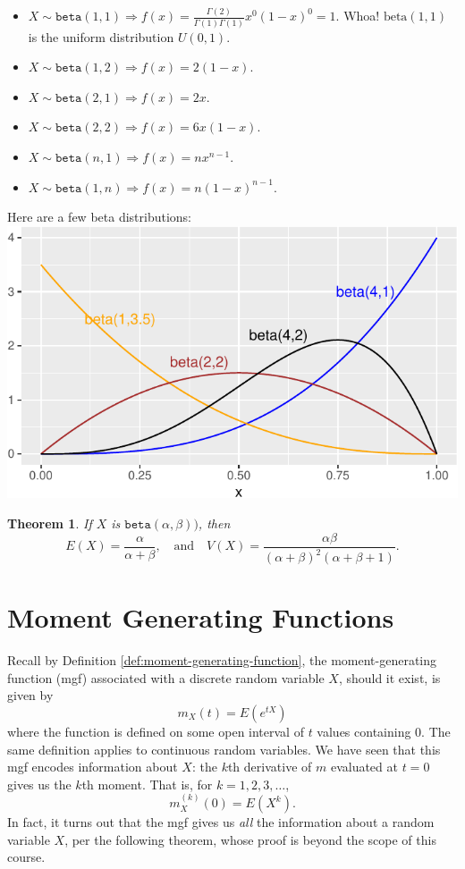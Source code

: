 \documentclass[
]{book}
\providecommand{\tightlist}{%
  \setlength{\itemsep}{0pt}\setlength{\parskip}{0pt}}
\newtheorem{theorem}{Theorem}[chapter]
\theoremstyle{definition}
\theoremstyle{definition}
\theoremstyle{definition}
\theoremstyle{definition}
\theoremstyle{remark}
\begin{document}
\begin{itemize}
\tightlist
\item
  \(\displaystyle X \sim \texttt{beta}(1,1) \Rightarrow f(x) = \frac{\Gamma(2)}{\Gamma(1)\Gamma(1)}x^0(1-x)^0 = 1\). Whoa! \(\text{beta}(1,1)\) is the uniform distribution \(U(0,1).\)
\item
  \(\displaystyle X \sim \texttt{beta}(1,2) \Rightarrow f(x) = 2(1-x)\).
\item
  \(\displaystyle X \sim \texttt{beta}(2,1) \Rightarrow f(x) = 2x\).
\item
  \(\displaystyle X \sim \texttt{beta}(2,2) \Rightarrow f(x) = 6x(1-x)\).
\item
  \(\displaystyle X \sim \texttt{beta}(n,1) \Rightarrow f(x) = nx^{n-1}\).
\item
  \(\displaystyle X \sim \texttt{beta}(1,n) \Rightarrow f(x) = n(1-x)^{n-1}\).
\end{itemize}

Here are a few beta distributions:
\includegraphics{math340-notes_files/figure-latex/unnamed-chunk-23-1.pdf}

\begin{theorem}
\protect\hypertarget{thm:beta-EandV}{}\label{thm:beta-EandV}If \(X\) is \(\texttt{beta}(\alpha,\beta))\), then \[E(X) = \frac{\alpha}{\alpha+\beta}, ~~~ \text{ and } ~~~ V(X) = \frac{\alpha\beta}{(\alpha+\beta)^2(\alpha+\beta+1)}.\]
\end{theorem}

\chapter{Moment Generating Functions}\label{mgf}

Recall by Definition \ref{def:moment-generating-function}, the moment-generating function (mgf) associated with a discrete random variable \(X\), should it exist, is given by \[m_X(t) = E(e^{tX})\] where the function is defined on some open interval of \(t\) values containing 0. The same definition applies to continuous random variables. We have seen that this mgf encodes information about \(X\): the \(k\)th derivative of \(m\) evaluated at \(t = 0\) gives us the \(k\)th moment. That is, for \(k = 1,2,3,\ldots\),
\[m_X^{(k)}(0) = E(X^k).\]
In fact, it turns out that the mgf gives us \emph{all} the information about a random variable \(X\), per the following theorem, whose proof is beyond the scope of this course.
\end{document}
